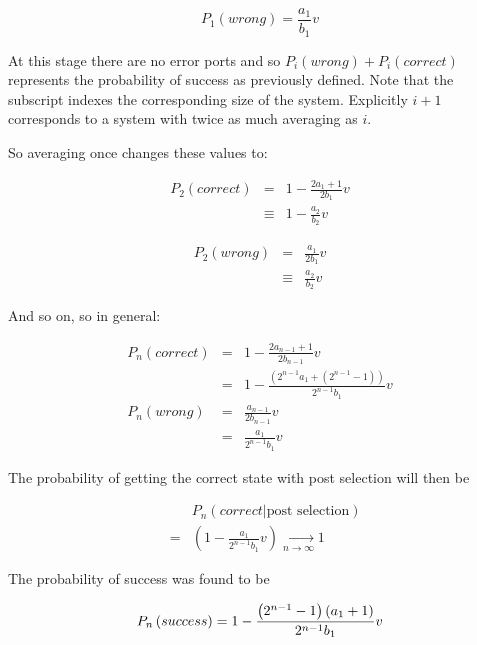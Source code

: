 \documentclass[aps,pra,twocolumn,superscriptaddress,numerical]{revtex4-1}
\begin{document}
		\begin{equation}
			P_{1}(wrong)=\frac{a_{1}}{b_{1}}v
		\end{equation}
			
		At this stage there are no error ports and so $P_{i}(wrong)+P_{i}(correct)$	represents the probability of success as previously defined. Note that the subscript indexes the corresponding size of the system. Explicitly $i+1$ corresponds to a system with twice as much averaging as $i$.
			
		So averaging once changes these values to:
			
		\begin{eqnarray}
			P_{2}(correct) & = & 1-\frac{2a_{1}+1}{2b_{1}}v\nonumber \\
			& \equiv & 1-\frac{a_{2}}{b_{2}}v
		\end{eqnarray}
		
		\begin{eqnarray}
			P_{2}(wrong) & = & \frac{a_{1}}{2b_{1}}v\nonumber \\
			& \equiv & \frac{a_{2}}{b_{2}}v
		\end{eqnarray}
			
		And so on, so in general:
			
		\begin{eqnarray}
			P_{n}(correct) & = & 1-\frac{2a_{n-1}+1}{2b_{n-1}}v\nonumber \\
			& = & 1-\frac{\left(2^{n-1}a_{1}+\left(2^{n-1}-1\right)\right)}{2^{n-1}b_{1}}v\\
			P_{n}(wrong) & = & \frac{a_{n-1}}{2b_{n-1}}v\nonumber \\
			& = & \frac{a_{1}}{2^{n-1}b_{1}}v
		\end{eqnarray}
			
		The probability of getting the correct state with post selection will then be
			
		\begin{eqnarray}
			&  & P_{n}\left(correct\left|\textrm{post selection}\right.\right)\nonumber \\
			& = & \left(1-\frac{a_{1}}{2^{n-1}b_{1}}v\right)\xrightarrow[n\rightarrow\infty]{}1\label{eq:PcorrectGeneral}
		\end{eqnarray}
				
		The probability of success was found to be
			
		\begin{equation}
			P_{n}\left(success\right) =  1-\frac{\left(2^{n-1}-1\right)\left(a_{1}+1\right)}{2^{n-1}b_{1}}v\nonumber \\
		\end{equation}
			
\end{document}
